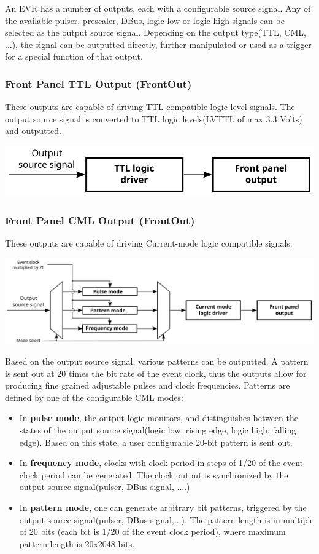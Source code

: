 \documentclass[12pt,a4paper]{article}
\begin{document}
An EVR has a number of outputs, each with a configurable source signal. Any of the available pulser, prescaler, DBus, logic low or logic high signals can be selected as the output source signal. Depending on the output type(TTL, CML, ...), the signal can be outputted directly, further manipulated or used as a trigger for a special function of that output. 

\subsubsection{Front Panel TTL Output (FrontOut)}
These outputs are capable of driving TTL compatible logic level signals. The output source signal is converted to TTL logic levels(LVTTL of max 3.3 Volts) and outputted.

	\includegraphics[]{./img/TTL}

\subsubsection{Front Panel CML Output (FrontOut)}
These outputs are capable of driving Current-mode logic compatible signals. 

	\includegraphics[width=\columnwidth]{./img/CML}


Based on the output source signal, various patterns can be outputted. A pattern is sent out at 20 times the bit rate of the event clock, thus the outputs allow for producing fine grained adjustable pulses and clock frequencies. Patterns are defined by one of the configurable CML modes:
\begin{itemize}
	\item In \textbf{pulse mode}, the output logic monitors, and distinguishes between the states of the output source signal(logic low, rising edge, logic high, falling edge). Based on this state, a user configurable 20-bit pattern is sent out.
	\item In \textbf{frequency mode}, clocks with clock period in steps of 1/20 of the event clock period can be generated. The clock output is synchronized by the output source signal(pulser, DBus signal, ....)
	\item In \textbf{pattern mode}, one can generate arbitrary bit patterns, triggered by the output source signal(pulser, DBus signal,...). The pattern length is in multiple of 20 bits (each bit is 1/20 of the event clock period), where maximum pattern length is 20x2048 bits.
\end{itemize}
\end{document}
